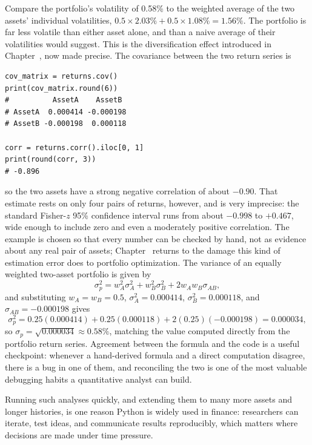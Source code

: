 \documentclass[../ai_in_finance]{subfiles}
\begin{document}
Compare the portfolio's volatility of 0.58\% to the weighted average of the two assets' individual volatilities, $0.5 \times 2.03\% + 0.5 \times 1.08\% = 1.56\%$. The portfolio is far less volatile than either asset alone, and than a naive average of their volatilities would suggest. This is the diversification effect introduced in Chapter~, now made precise. The covariance between the two return series is

\begin{verbatim}
cov_matrix = returns.cov()
print(cov_matrix.round(6))
#          AssetA    AssetB
# AssetA  0.000414 -0.000198
# AssetB -0.000198  0.000118

corr = returns.corr().iloc[0, 1]
print(round(corr, 3))
# -0.896
\end{verbatim}
so the two assets have a strong negative correlation of about $-0.90$. That estimate rests on only four pairs of returns, however, and is very imprecise: the standard Fisher-$z$ 95\% confidence interval runs from about $-0.998$ to $+0.467$, wide enough to include zero and even a moderately positive correlation. The example is chosen so that every number can be checked by hand, not as evidence about any real pair of assets; Chapter~ returns to the damage this kind of estimation error does to portfolio optimization. The variance of an equally weighted two-asset portfolio is given by
\begin{equation}
\sigma_p^2 = w_A^2 \sigma_A^2 + w_B^2 \sigma_B^2 + 2 w_A w_B \sigma_{AB},\label{eq:python-portfolio-variance}
\end{equation}
and substituting $w_A = w_B = 0.5$, $\sigma_A^2 = 0.000414$, $\sigma_B^2 = 0.000118$, and $\sigma_{AB} = -0.000198$ gives
\begin{equation*}
\sigma_p^2 = 0.25(0.000414) + 0.25(0.000118) + 2(0.25)(-0.000198) = 0.000034,
\end{equation*}
so $\sigma_p = \sqrt{0.000034} \approx 0.58\%$, matching the value computed directly from the portfolio return series. Agreement between the formula and the code is a useful checkpoint: whenever a hand-derived formula and a direct computation disagree, there is a bug in one of them, and reconciling the two is one of the most valuable debugging habits a quantitative analyst can build.

Running such analyses quickly, and extending them to many more assets and longer histories, is one reason Python is widely used in finance: researchers can iterate, test ideas, and communicate results reproducibly, which matters where decisions are made under time pressure.
\end{document}

